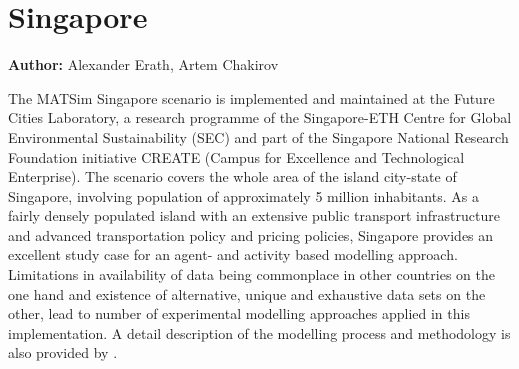 \section{Singapore}
\label{ch:scenarios:singapore}
\hfill \textbf{Author:} Alexander Erath, Artem Chakirov

The MATSim Singapore scenario is implemented and maintained at the Future Cities Laboratory, a research programme of the Singapore-ETH Centre for Global Environmental Sustainability (SEC) and part of the Singapore National Research Foundation initiative CREATE (Campus for Excellence and Technological Enterprise). The scenario covers the whole area of the island city-state of Singapore, involving population of approximately 5 million inhabitants. As a fairly densely populated island with an extensive public transport infrastructure and advanced transportation policy and pricing policies, Singapore provides an excellent study case for an agent- and activity based modelling approach. 
Limitations in availability of data being commonplace in other countries on the one hand and existence of alternative, unique and exhaustive data sets on the other, lead to number of experimental modelling approaches applied in this implementation.  A detail description of the modelling process and methodology is also provided by \citet[][]{ErathEtAl_TechRep_FCL_forth, Erath_unpub_UniSeoul_2011}.

